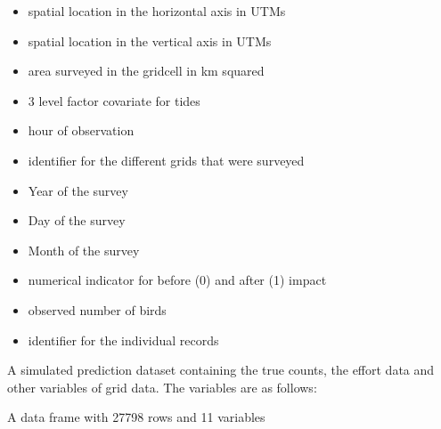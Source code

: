 \documentclass[a4paper]{book}
\begin{document}
\begin{Details}\relax
\begin{itemize}

\item {} spatial location in the horizontal axis in UTMs
\item {} spatial location in the vertical axis in UTMs
\item {} area surveyed in the gridcell in km squared
\item {} 3 level factor covariate for tides
\item {} hour of observation
\item {} identifier for the different grids that were surveyed
\item {} Year of the survey
\item {} Day of the survey
\item {} Month of the survey 
\item {} numerical indicator for before (0) and after (1) impact
\item {} observed number of birds
\item {} identifier for the individual records 

\end{itemize}

\end{Details}
%
\begin{Description}\relax
A simulated prediction dataset containing the true counts, the effort data and other variables of 
grid data. The variables are as follows:
\end{Description}
%
\begin{Format}
A data frame with 27798 rows and 11 variables
\end{Format}
%
\end{document}

